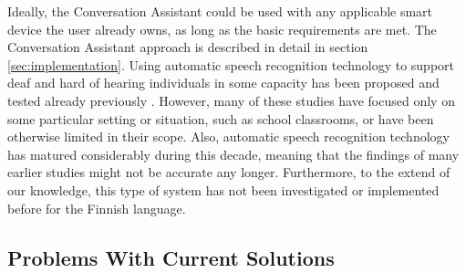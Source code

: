 \documentclass[english, 12pt, a4paper, pdftex, elec, utf8]{aaltothesis}
\begin{document}
Ideally, the Conversation Assistant could be used with any applicable smart device the user already owns, as long as the basic requirements are met. The Conversation Assistant approach is described in detail in section \ref{sec:implementation}. Using automatic speech recognition technology to support deaf and hard of hearing individuals in some capacity has been proposed and tested already previously \cite{robison1996computer, kheir2007inclusion, mirzaei2012combining}. However, many of these studies have focused only on some particular setting or situation, such as school classrooms, or have been otherwise limited in their scope. Also, automatic speech recognition technology has matured considerably during this decade, meaning that the findings of many earlier studies might not be accurate any longer. Furthermore, to the extend of our knowledge, this type of system has not been investigated or implemented before for the Finnish language.

\subsection{Problems With Current Solutions}
\end{document}
